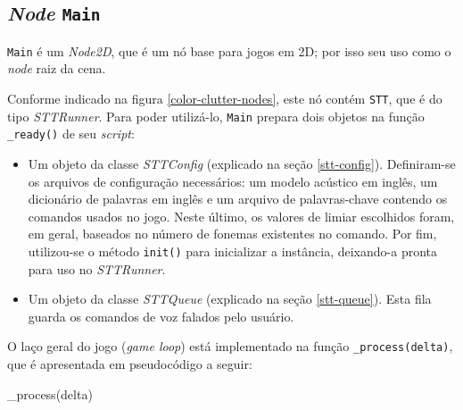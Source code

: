 
\subsection{\textit{Node} \texttt{Main}}

\texttt{Main} é um \textit{Node2D}, que é um nó base para jogos em 2D; por isso seu uso como o \textit{node} raiz da cena.

Conforme indicado na figura \ref{color-clutter-nodes}, este nó contém \texttt{STT}, que é do tipo \textit{STTRunner}. Para poder utilizá-lo, \texttt{Main} prepara dois objetos na função \texttt{\_ready()} de seu \textit{script}:

\begin{itemize}
\item Um objeto da classe \textit{STTConfig} (explicado na seção \ref{stt-config}). Definiram-se os arquivos de configuração necessários: um modelo acústico em inglês, um dicionário de palavras em inglês e um arquivo de palavras-chave contendo os comandos usados no jogo. Neste último, os valores de limiar escolhidos foram, em geral, baseados no número de fonemas existentes no comando. Por fim, utilizou-se o método \texttt{init()} para inicializar a instância, deixando-a pronta para uso no \textit{STTRunner}.

\item Um objeto da classe \textit{STTQueue} (explicado na seção \ref{stt-queue}). Esta fila guarda os comandos de voz falados pelo usuário.
\end{itemize}

O laço geral do jogo (\textit{game loop}) está implementado na função \texttt{\_process(delta)}, que é apresentada em pseudocódigo a seguir:

\begin{algorithm}
\begin{algorithmic}[1]
\Function{}{} {\_process}(delta)
\EndIf
\State
{}
    \EndIf
{}
    \EndIf
\EndIf
\State
{}
\EndIf
\EndFunction
\end{algorithmic}
\end{algorithm}

